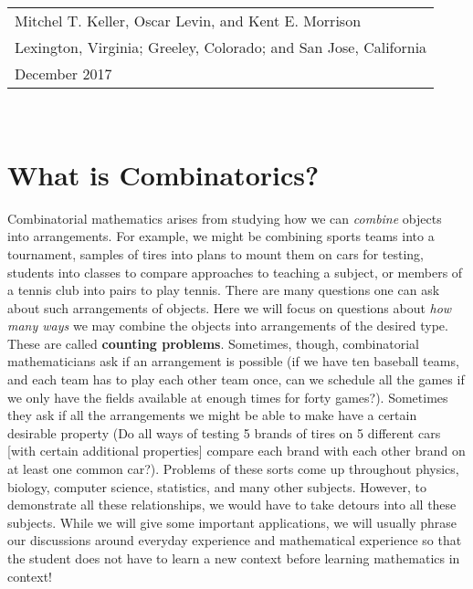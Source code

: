 \documentclass[10pt,]{book}
\newcommand{\terminology}[1]{\textbf{#1}}
\theoremstyle{plain}
\theoremstyle{definition}
\theoremstyle{definition}
\numberwithin{equation}{chapter}
\begin{document}
\par\hfill\begin{tabular}{l@{}}
Mitchel T. Keller, Oscar Levin, and Kent E. Morrison\\
Lexington, Virginia; Greeley, Colorado; and San Jose, California\\
December 2017
\end{tabular}\\\par
\setcounter{tocdepth}{2}
\renewcommand*\contentsname{Contents}
\tableofcontents
\mainmatter
\typeout{************************************************}
\typeout{************************************************}
\chapter[{What is Combinatorics?}]{What is Combinatorics?}\label{what-is}
\hypertarget{p-26}{}%
Combinatorial mathematics arises from studying how we can \emph{combine} objects into arrangements. For example, we might be combining sports teams into a tournament, samples of tires into plans to mount them on cars for testing, students into classes to compare approaches to teaching a subject, or members of a tennis club into pairs to play tennis. There are many questions one can ask about such arrangements of objects. Here we will focus on questions about \emph{how many ways} we may combine the objects into arrangements of the desired type. These are called \terminology{counting problems}. Sometimes, though, combinatorial mathematicians ask if an arrangement is possible (if we have ten baseball teams, and each team has to play each other team once, can we schedule all the games if we only have the fields available at enough times for forty games?).  Sometimes they ask if all the arrangements we might be able to make have a certain desirable property (Do all ways of testing 5 brands of tires on 5 different cars [with certain additional properties] compare each brand with each other brand on at least one common car?). Problems of these sorts come up throughout physics, biology, computer science, statistics, and many other subjects. However, to demonstrate all these relationships, we would have to take detours into all these subjects. While we will give some important applications, we will usually phrase our discussions around everyday experience and mathematical experience so that the student does not have to learn a new context before learning mathematics in context!%
\typeout{************************************************}
\typeout{************************************************}
\end{document}
